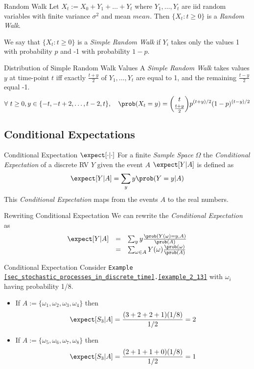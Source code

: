 \documentclass[11pt,a4paper]{article}
\begin{document}
  \begin{definition}{Random Walk}
    Let $X_t:=X_0+Y_1+\dots+Y_t$ where $Y_1,\dots,Y_t$ are iid random variables with finite variance $\sigma^2$ and mean $mean$. Then $\{X_t:t\geq0\}$ is a \textit{Random Walk}.
    \par We say that $\{X_t:t\geq0\}$ is a \textit{Simple Random Walk} if $Y_i$ takes only the values 1 with probability $p$ and -1 with probability $1-p$.
  \end{definition}

  \begin{proposition}{Distribution of Simple Random Walk Values}
    A \textit{Simple Random Walk} takes values $y$ at time-point $t$ iff exactly $\frac{t+y}2$ of $Y_1,\dots,Y_t$ are equal to 1, and the remaining $\frac{t-y}2$ equal -1.
    \[ \forall\ t\geq0,y\in\{-t,-t+2,\dots,t-2,t\},\quad\prob(X_t=y)={t\choose {\frac{t+y}2}}p^{(t+y)/2}(1-p)^{(t-y)/2} \]
  \end{proposition}

\subsection{Conditional Expectations}

  \begin{definition}{Conditional Expectation $\expect[\cdot|\cdot]$}
    For a finite \textit{Sample Space} $\Omega$ the \textit{Conditional Expectation} of a discrete RV $Y$ given the event $A$ $\expect[Y|A]$ is defined as
    \[ \expect[Y|A]=\sum_yy\prob(Y=y|A) \]
    This \textit{Conditional Expectation} maps from the events $A$ to the real numbers.
  \end{definition}

  \begin{remark}{Rewriting Conditional Expectation}
    We can rewrite the \textit{Conditional Expectation} as
    \[\begin{array}{rcl}
      \expect[Y|A]&=&\sum_yy\frac{\prob(Y(\omega)=y,A)}{\prob(A)}\\
      &=&\sum_{\omega\in A}Y(\omega)\frac{\prob(\omega)}{\prob(A)}
    \end{array}\]
  \end{remark}

  \begin{example}{Conditional Expectation}
    Consider \texttt{Example \ref{sec_stochastic_processes_in_discrete_time}.\ref{example_2_13}} with $\omega_i$ having probability 1/8.
    \begin{itemize}
      \item If $A:=\{\omega_1,\omega_2,\omega_3,\omega_4\}$ then
      \[ \expect[S_3|A]=\frac{(3+2+2+1)(1/8)}{1/2}=2 \]
      \item If $A:=\{\omega_5,\omega_6,\omega_7,\omega_8\}$ then
      \[ \expect[S_3|A]=\frac{(2+1+1+0)(1/8)}{1/2}=1 \]
    \end{itemize}
  \end{example}
\end{document}
